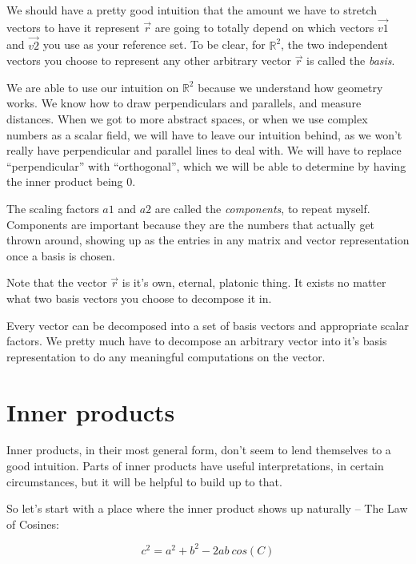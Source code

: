 \documentclass[
]{book}
\begin{document}
We should have a pretty good intuition that the amount we have to stretch vectors to have it represent \(\vec{r}\) are going to totally depend on which vectors \(\vec{v1}\) and \(\vec{v2}\) you use as your reference set. To be clear, for \(\mathbb{R}^2\), the two independent vectors you choose to represent any other arbitrary vector \(\vec{r}\) is called the \emph{basis}.

We are able to use our intuition on \(\mathbb{R}^2\) because we understand how geometry works. We know how to draw perpendiculars and parallels, and measure distances. When we got to more abstract spaces, or when we use complex numbers as a scalar field, we will have to leave our intuition behind, as we won't really have perpendicular and parallel lines to deal with. We will have to replace ``perpendicular'' with ``orthogonal'', which we will be able to determine by having the inner product being 0.

The scaling factors \(a1\) and \(a2\) are called the \emph{components}, to repeat myself. Components are important because they are the numbers that actually get thrown around, showing up as the entries in any matrix and vector representation once a basis is chosen.

Note that the vector \(\vec{r}\) is it's own, eternal, platonic thing. It exists no matter what two basis vectors you choose to decompose it in.

Every vector can be decomposed into a set of basis vectors and appropriate scalar factors. We pretty much have to decompose an arbitrary vector into it's basis representation to do any meaningful computations on the vector.

\hypertarget{inner-products}{%
\section{Inner products}\label{inner-products}}

Inner products, in their most general form, don't seem to lend themselves to a good intuition. Parts of inner products have useful interpretations, in certain circumstances, but it will be helpful to build up to that.

So let's start with a place where the inner product shows up naturally -- The Law of Cosines:

\[c^2 = a^2 + b^2 - 2 a b \ cos(C)\]
\end{document}
